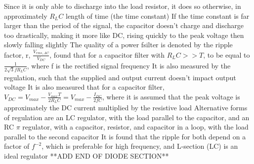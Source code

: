 \documentclass[11 pt, twoside]{article}
\newenvironment{outline*}
{
	\begin{outline}[enumerate]
	}
	{\end{outline}
}
\begin{document}
\begin{outline*}
		\3 Since it is only able to discharge into the load resistor, it does so otherwise, in approximately $R_LC$ length of time (the time constant)
		\3 If the time constant is far larger than the period of the signal, the capacitor doesn't charge and discharge too drastically, making it more like DC, rising quickly to the peak voltage then slowly falling slightly
	\2 The quality of a power fsilter is denoted by the ripple factor, r, $\frac{V_{rms,AC}}{V_{DC}}$, found that for a capacitor filter with $R_LC >> T$, to be equal to $\frac{1}{2\sqrt{3}fR_LC}$, where f is the rectified signal frequency
		\3 It is also measured by the regulation, such that the supplied and output current doesn't impact output voltage
	\2 It is also measured that for a capacitor filter, $V_{DC} = V_{max} - \frac{V_{max}T}{2R_LC} = V_{max} - \frac{I_{DC}}{2fC}$, where it is assumed that the peak voltage is approximately the DC current multiplied by the resistive load
	\2 Alternative forms of regulation are an LC regulator, with the load parallel to the capacitor, and an RC $\pi$ regulator, with a capacitor, resistor, and capacitor in a loop, with the load parallel to the second capacitor
		\3 It is found that the ripple for both depend on a factor of $f^{-2}$, which is preferable for high frequency, and L-section (LC) is an ideal regulator
\1 **ADD END OF DIODE SECTION**
\end{outline*}
\end{document}
